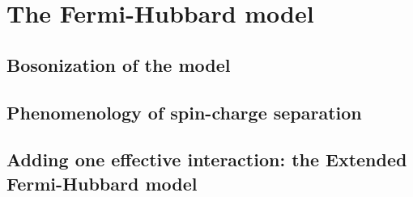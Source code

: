 \clearpage
\section{The Fermi-Hubbard model}

\todo

\subsection{Bosonization of the model}

\todo

\subsection{Phenomenology of spin-charge separation}

\todo

\subsection{Adding one effective interaction: the Extended Fermi-Hubbard model}

\todo